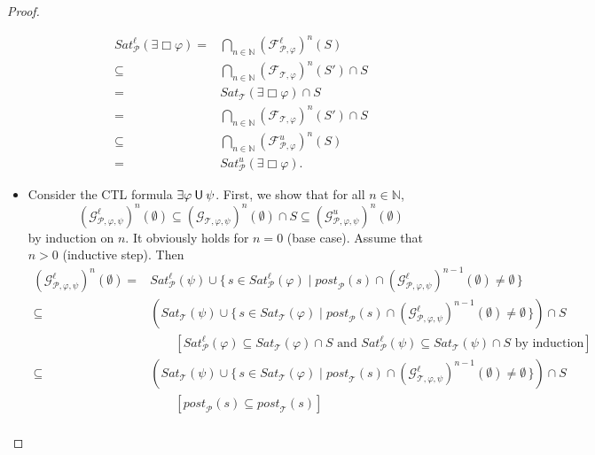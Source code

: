 \documentclass[12pt]{article}
\newcommand{\always}{\Box}
\newcommand{\until}{\mathbin{\sf U}}
\theoremstyle{definition}
\newcommand{\comment}[1]{\hspace{2em}[\mbox{#1}]}
\begin{document}
\begin{proof}
\begin{itemize}
\begin{align*}
\mathit{Sat}^{\ell}_{\mathcal{P}}(\exists \always \varphi) 
= & \bigcap_{n \in \mathbb{N}} (\mathcal{F}_{\mathcal{P}, \varphi}^{\ell})^{n}(S)\\
\subseteq & \bigcap_{n \in \mathbb{N}} (\mathcal{F}_{\mathcal{T}, \varphi})^{n}(S') \cap S\\
= & \mathit{Sat}_{\mathcal{T}}(\exists \always \varphi)  \cap S\\
= & \bigcap_{n \in \mathbb{N}} (\mathcal{F}_{\mathcal{T}, \varphi})^{n}(S')  \cap S\\
\subseteq & \bigcap_{n \in \mathbb{N}} (\mathcal{F}_{\mathcal{P}, \varphi}^{u})^{n}(S)\\
= & \mathit{Sat}^{u}_{\mathcal{P}}(\exists \always \varphi).
\end{align*}
\item
Consider the CTL formula $\exists \varphi \until \psi$.   First, we show that for all $n \in \mathbb{N}$,
\[
(\mathcal{G}_{\mathcal{P}, \varphi, \psi}^{\ell})^n(\emptyset)
\subseteq (\mathcal{G}_{\mathcal{T}, \varphi, \psi})^{n}(\emptyset) \cap S
\subseteq (\mathcal{G}_{\mathcal{P}, \varphi, \psi}^{u})^n(\emptyset)
\]
by induction on $n$.  It obviously holds for $n=0$ (base case).  Assume that $n>0$ (inductive step).  Then
\begin{align*}
(\mathcal{G}_{\mathcal{P}, \varphi, \psi}^{\ell})^n(\emptyset)
= & \mathit{Sat}^{\ell}_{\mathcal{P}}(\psi) \cup \{\, s \in \mathit{Sat}^{\ell}_{\mathcal{P}}(\varphi) \mid  \mathit{post}_{\mathcal{P}}(s) \cap (\mathcal{G}_{\mathcal{P}, \varphi, \psi}^{\ell})^{n-1}(\emptyset) \not= \emptyset \,\}\\
\subseteq & (\mathit{Sat}_{\mathcal{T}}(\psi) \cup \{\, s \in \mathit{Sat}_{\mathcal{T}}(\varphi) \mid \mathit{post}_{\mathcal{P}}(s) \cap (\mathcal{G}_{\mathcal{P}, \varphi, \psi}^{\ell})^{n-1}(\emptyset) \not= \emptyset \,\}) \cap S\\
& \comment{$\mathit{Sat}^{\ell}_{\mathcal{P}}(\varphi) \subseteq \mathit{Sat}_{\mathcal{T}}(\varphi) \cap S$ and $\mathit{Sat}^{\ell}_{\mathcal{P}}(\psi) \subseteq \mathit{Sat}_{\mathcal{T}}(\psi) \cap S$ by induction}\\
\subseteq & (\mathit{Sat}_{\mathcal{T}}(\psi) \cup \{\, s \in \mathit{Sat}_{\mathcal{T}}(\varphi) \mid \mathit{post}_{\mathcal{T}}(s) \cap (\mathcal{G}_{\mathcal{T}, \varphi, \psi}^{\ell})^{n-1}(\emptyset) \not= \emptyset \,\}) \cap S\\
& \comment{$\mathit{post}_{\mathcal{P}}(s) \subseteq \mathit{post}_{\mathcal{T}}(s)$}\\

\end{align*}
\end{itemize}
\end{proof}
\end{document}
